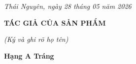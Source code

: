 \vspace{1cm}

\begin{flushright}
	\begin{minipage}{0.50\textwidth}
		\centering
		{\fontsize{13}{16}\selectfont\itshape
			Thái Nguyên, ngày 28 tháng 05 năm 2026}
		
		\vspace{0.45cm}
		
		{\fontsize{15}{18}\selectfont\bfseries
			TÁC GIẢ CỦA SẢN PHẨM}
		
		\vspace{0.25cm}
		
		{\fontsize{13}{16}\selectfont\itshape
			(Ký và ghi rõ họ tên)}
		
		\vspace{2.3cm}
		
		{\fontsize{15}{18}\selectfont\bfseries
			Hạng A Tráng}
	\end{minipage}
\end{flushright}